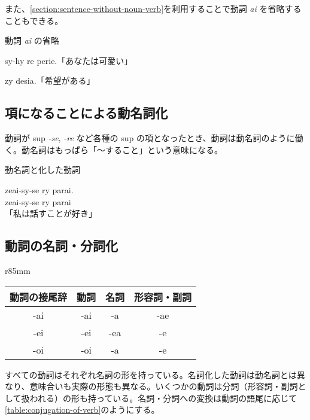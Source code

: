 また、\cref{section:sentence-without-noun-verb}を利用することで動詞 \emph{ai} を省略することもできる。

\begin{itembox}[l]{動詞 \emph{ai} の省略}
    \begin{pindent}
        \noindent
        sy-hy re perie.「あなたは可愛い」

        \noindent
        zy desia.「希望がある」
    \end{pindent}
\end{itembox}

\subsection{項になることによる動名詞化}

動詞が sup \emph{-se}, \emph{-re} など各種の sup の項となったとき、動詞は動名詞のように働く。動名詞はもっぱら「～すること」という意味になる。

\begin{itembox}[l]{動名詞と化した動詞}
    \begin{pindent}
        \noindent
        zeai-sy-se ry parai. \\
        zeai-sy-se
            ry parai \\
        「私は話すことが好き」
    \end{pindent}
\end{itembox}

\subsection{動詞の名詞・分詞化}

\begin{wraptable}[8]{r}{85mm}
    \centering
    \caption{動詞の名詞・分詞化}
    \label{table:conjugation-of-verb}
    \begin{tabular}{cccc}
        \toprule
        動詞の接尾辞 & 動詞 & 名詞 & 形容詞・副詞 \\
        \midrule
        -ai & -ai & -a  & -ae \\
        -ei & -ei & -ea & -e  \\
        -oi & -oi & -a  & -e \\
        \bottomrule
    \end{tabular}
\end{wraptable}

すべての動詞はそれぞれ名詞の形を持っている。名詞化した動詞は動名詞とは異なり、意味合いも実際の形態も異なる。いくつかの動詞は分詞（形容詞・副詞として扱われる）の形も持っている。名詞・分詞への変換は動詞の語尾に応じて\cref{table:conjugation-of-verb}のようにする。

